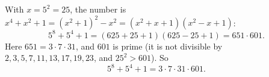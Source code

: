 With $x=5^2=25$, the number is $x^4+x^2+1=\left(x^2+1\right)^2-x^2=\left(x^2+x+1\right)\left(x^2-x+1\right)$:
\[5^8+5^4+1=(625+25+1)(625-25+1)=651\cdot601.\]
Here $651=3\cdot7\cdot31$, and $601$ is prime (it is not divisible by $2,3,5,7,11,13,17,19,23$, and $25^2>601$). So
\[5^8+5^4+1=\boxed{3\cdot7\cdot31\cdot601}.\]
